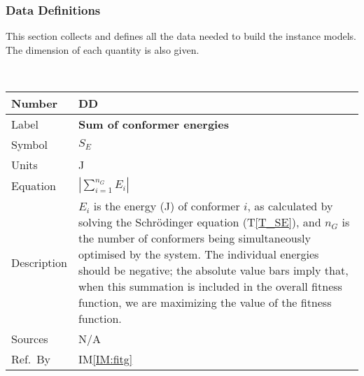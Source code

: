 \documentclass[12pt]{article}
\newcommand{\colAwidth}{0.13\textwidth}
\newcommand{\colBwidth}{0.82\textwidth}
\newcounter{defnum} %
\newcounter{datadefnum} %
\newcommand{\iref}[1]{IM\ref{#1}}
\begin{document}

\subsubsection{Data Definitions}\label{sec_datadef}

This section collects and defines all the data needed to build the instance
models. The dimension of each quantity is also given.  

~\newline

\noindent
\begin{minipage}{\textwidth}
	\renewcommand*{\arraystretch}{1.5}
	\begin{tabular}{| p{\colAwidth} | p{\colBwidth}|}
		\hline
		\rowcolor[gray]{0.9}
		Number & DD{datadefnum}\thedatadefnum \label{Sum_E}\\
		\hline
		Label & \bf Sum of conformer energies\\
		\hline
		Symbol & $S_E$\\
		\hline
		Units & \si{\joule}\\
		\hline
		Equation & $\left|\sum\limits_{i=1}^{n_G}E_i\right|$ \\
		\hline
		Description & 
		$E_i$ is the energy (\si{\joule}) of conformer $i$, as calculated by 
		solving the Schr\"{o}dinger equation (T\ref{T_SE}), and $n_G$ is the 
		number of conformers being simultaneously optimised by the system. The 
		individual energies should be negative; the absolute value bars imply 
		that, when this summation is included in the overall fitness function, 
		we are maximizing the value of the fitness 
		function.
		\\
		\hline
		Sources& N/A \\
		\hline
		Ref.\ By & \iref{IM:fitg}\\
		\hline
	\end{tabular}
\end{minipage}\\
\end{document}
